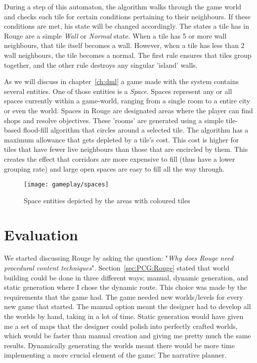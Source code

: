 During a step of this automaton, the algorithm walks through the game world and checks each tile for certain conditions pertaining to their neighbours. If these conditions are met, his state will be changed accordingly. The states a tile has in Rouge are a simple \textit{Wall} or \textit{Normal} state. When a tile has 5 or more wall neighbours, that tile itself becomes a wall. However, when a tile has less than 2 wall neighbours, the tile becomes a normal. The first rule ensures that tiles group together, and the other rule destroys any singular 'island' walls.

As we will discuss in chapter~\ref{ch:dml} a game made with the \diage system contains several entities.
One of those entities is a \textit{Space}.
Spaces represent any or all spaces currently within a game-world, ranging from a single room to a entire city or even the world. Spaces in Rouge are designated areas where the player can find shops and resolve \his objectives. These 'rooms' are generated using a simple tile-based flood-fill algorithm that circles around a selected tile. The algorithm has a maximum allowance that gets depleted by a tile's cost. This cost is higher for tiles that have fewer live neighbours than those that are encircled by them. This creates the effect that corridors are more expensive to fill (thus have a lower grouping rate) and large open spaces are easy to fill all the way through.

\begin{figure}[p]
	\texttt{[image: gameplay/spaces]}
	\caption{Space entities depicted by the areas with coloured tiles}\label{img:gameplay:spaces}
\end{figure}


\section{Evaluation}
We started discussing Rouge by asking the question: "\textit{Why does Rouge need procedural content techniques}". 
Section~\ref{sec:PCG:Rouge} stated that world building could be done in three different ways; manual, dynamic generation, and static generation where I chose the dynamic route.
This choice was made by the requirements that the game had.
The game needed new worlds/levels for every new game that started. 
The manual option meant the designer had to develop all the worlds by hand, taking in a lot of time. 
Static generation would have given me a set of maps that the designer could polish into perfectly crafted worlds, which would be faster than manual creation and giving me pretty much the same results.
Dynamically generating the worlds meant there would be more time implementing a more crucial element of the game: The narrative planner. 

